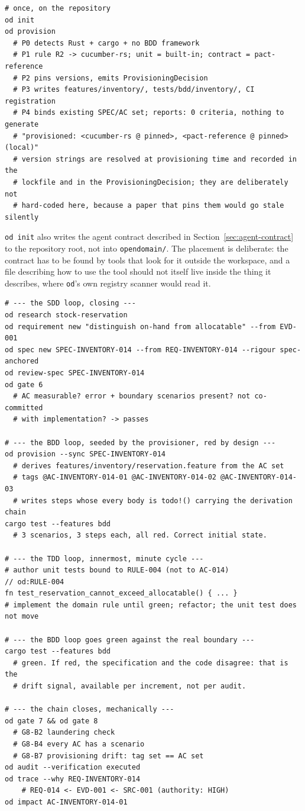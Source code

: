 \documentclass[11pt,a4paper]{article}
\begin{document}
\begin{Verbatim}[fontsize=\footnotesize,breaklines=true,breakanywhere=true,breakautoindent=false,samepage=false]
# once, on the repository
od init
od provision
  # P0 detects Rust + cargo + no BDD framework
  # P1 rule R2 -> cucumber-rs; unit = built-in; contract = pact-reference
  # P2 pins versions, emits ProvisioningDecision
  # P3 writes features/inventory/, tests/bdd/inventory/, CI registration
  # P4 binds existing SPEC/AC set; reports: 0 criteria, nothing to generate
  # "provisioned: <cucumber-rs @ pinned>, <pact-reference @ pinned> (local)"
  # version strings are resolved at provisioning time and recorded in the
  # lockfile and in the ProvisioningDecision; they are deliberately not
  # hard-coded here, because a paper that pins them would go stale silently
\end{Verbatim}

\texttt{od init} also writes the agent contract described in
Section~\ref{sec:agent-contract} to the
repository root, not into \texttt{opendomain/}. The placement is deliberate: the
contract has to be found by tools that look for it outside the workspace, and a
file describing how to use the tool should not itself live inside the thing it
describes, where \texttt{od}'s own registry scanner would read it.

\begin{lstlisting}[style=odtrace]
# --- the SDD loop, closing ---
od research stock-reservation
od requirement new "distinguish on-hand from allocatable" --from EVD-001
od spec new SPEC-INVENTORY-014 --from REQ-INVENTORY-014 --rigour spec-anchored
od review-spec SPEC-INVENTORY-014
od gate 6
  # AC measurable? error + boundary scenarios present? not co-committed
  # with implementation? -> passes

# --- the BDD loop, seeded by the provisioner, red by design ---
od provision --sync SPEC-INVENTORY-014
  # derives features/inventory/reservation.feature from the AC set
  # tags @AC-INVENTORY-014-01 @AC-INVENTORY-014-02 @AC-INVENTORY-014-03
  # writes steps whose every body is todo!() carrying the derivation chain
cargo test --features bdd
  # 3 scenarios, 3 steps each, all red. Correct initial state.

# --- the TDD loop, innermost, minute cycle ---
# author unit tests bound to RULE-004 (not to AC-014)
// od:RULE-004
fn test_reservation_cannot_exceed_allocatable() { ... }
# implement the domain rule until green; refactor; the unit test does not move

# --- the BDD loop goes green against the real boundary ---
cargo test --features bdd
  # green. If red, the specification and the code disagree: that is the
  # drift signal, available per increment, not per audit.

# --- the chain closes, mechanically ---
od gate 7 && od gate 8
  # G8-B2 laundering check
  # G8-B4 every AC has a scenario
  # G8-B7 provisioning drift: tag set == AC set
od audit --verification executed
od trace --why REQ-INVENTORY-014
    # REQ-014 <- EVD-001 <- SRC-001 (authority: HIGH)
od impact AC-INVENTORY-014-01
\end{lstlisting}
\end{document}
